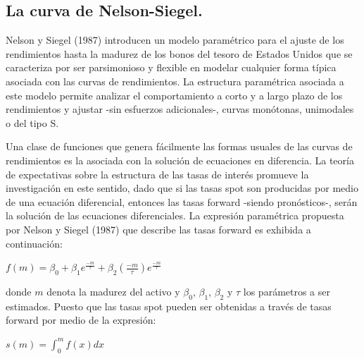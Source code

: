 \subsection{La curva de Nelson-Siegel.\\} 

\hspace*{0.4 cm} Nelson y Siegel (1987) introducen un modelo param\'etrico para el ajuste
de los rendimientos hasta la madurez de los bonos del tesoro de Estados
Unidos que se caracteriza por ser parsimonioso y flexible en modelar
cualquier forma t\'ipica asociada con las curvas de rendimientos. La estructura
param\'etrica asociada a este modelo permite analizar el comportamiento
a corto y a largo plazo de los rendimientos y ajustar -sin
esfuerzos adicionales-, curvas mon\'otonas, unimodales o del tipo S.


\hspace*{0.4 cm} Una clase de funciones que genera f\'acilmente las formas usuales de las
curvas de rendimientos es la asociada con la soluci\'on de ecuaciones en
diferencia. La teor\'ia de expectativas sobre la estructura de las tasas de
inter\'es promueve la investigaci\'on en este sentido, dado que si las tasas
spot son producidas por medio de una ecuaci\'on diferencial, entonces las
tasas forward -siendo pron\'osticos-, ser\'an la soluci\'on de las ecuaciones
diferenciales. La expresi\'on param\'etrica propuesta por Nelson y Siegel
(1987) que describe las tasas forward es exhibida a continuaci\'on:


\begin{center}
$\displaystyle{f(m) = \beta_{0} + \beta_{1} e^{\frac{-m}{\tau}} +\beta_{2} \left(\frac{-m}{\tau}\right)e^{\frac{-m}{\tau}}}$
\end{center}

\vspace*{0.2 cm}

\noindent donde $m$ denota la madurez del activo y $\beta_{0}$, $\beta_{1}$, $\beta_{2}$ y $\tau$ los par\'ametros a ser
estimados. Puesto que las tasas spot pueden ser obtenidas a trav\'es de tasas
forward por medio de la expresi\'on:

\vspace*{0.2 cm}

\begin{center}
$\displaystyle{s(m) = \int_{0}^{m}f(x)dx}$
\end{center}

\vspace*{0.2 cm}


